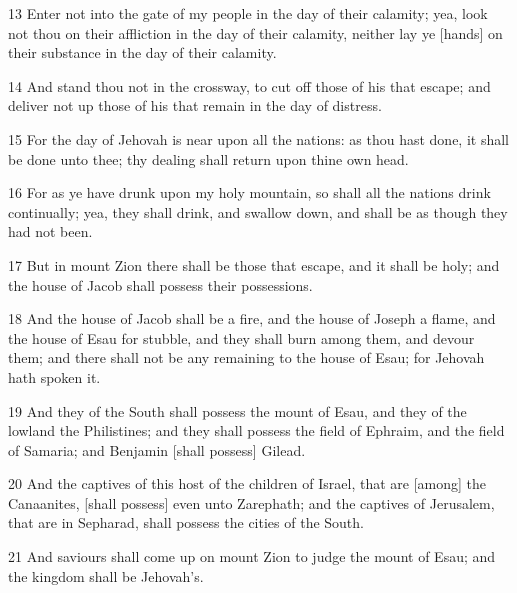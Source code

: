 \par 13 Enter not into the gate of my people in the day of their calamity; yea, look not thou on their affliction in the day of their calamity, neither lay ye [hands] on their substance in the day of their calamity.
\par 14 And stand thou not in the crossway, to cut off those of his that escape; and deliver not up those of his that remain in the day of distress.
\par 15 For the day of Jehovah is near upon all the nations: as thou hast done, it shall be done unto thee; thy dealing shall return upon thine own head.
\par 16 For as ye have drunk upon my holy mountain, so shall all the nations drink continually; yea, they shall drink, and swallow down, and shall be as though they had not been.
\par 17 But in mount Zion there shall be those that escape, and it shall be holy; and the house of Jacob shall possess their possessions.
\par 18 And the house of Jacob shall be a fire, and the house of Joseph a flame, and the house of Esau for stubble, and they shall burn among them, and devour them; and there shall not be any remaining to the house of Esau; for Jehovah hath spoken it.
\par 19 And they of the South shall possess the mount of Esau, and they of the lowland the Philistines; and they shall possess the field of Ephraim, and the field of Samaria; and Benjamin [shall possess] Gilead.
\par 20 And the captives of this host of the children of Israel, that are [among] the Canaanites, [shall possess] even unto Zarephath; and the captives of Jerusalem, that are in Sepharad, shall possess the cities of the South.
\par 21 And saviours shall come up on mount Zion to judge the mount of Esau; and the kingdom shall be Jehovah's.

